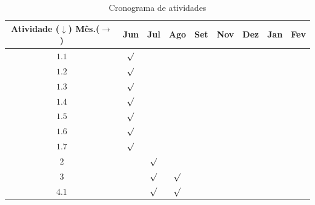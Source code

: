 \documentclass[conference,harvard,brazil,english]{sbatex}
\begin{document}
            \begin{table}[!h]
            \caption{Cronograma de atividades}
                \begin{center}
                    \footnotesize{
                        \begin{tabular}{c|c|c|c|c|c|c|c|c}
                            \hline
                            Atividade ($\downarrow$) Mês.($\rightarrow$)    & Jun     & Jul     & Ago     & Set     & Nov     & Dez     & Jan     & Fev     \\ \hline
                            $1.1$                                           & $\surd$ &         &         &         &         &         &         &         \\ \hline
                            $1.2$                                           & $\surd$ &         &         &         &         &         &         &         \\ \hline
                            $1.3$                                           & $\surd$ &         &         &         &         &         &         &         \\ \hline
                            $1.4$                                           & $\surd$ &         &         &         &         &         &         &         \\ \hline
                            $1.5$                                           & $\surd$ &         &         &         &         &         &         &         \\ \hline
                            $1.6$                                           & $\surd$ &         &         &         &         &         &         &         \\ \hline
                            $1.7$                                           & $\surd$ &         &         &         &         &         &         &         \\ \hline
                            $2$                                             &         & $\surd$ &         &         &         &         &         &         \\ \hline
                            $3$                                             &         & $\surd$ & $\surd$ &         &         &         &         &         \\ \hline
                            $4.1$                                           &         & $\surd$ & $\surd$ &         &         &         &         &         \\ \hline

\end{tabular}}
\end{center}
\end{table}
\end{document}

